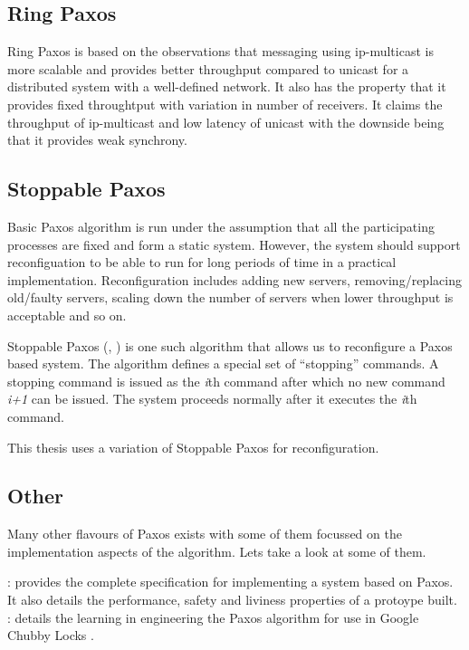 \subsection{Ring Paxos}

Ring Paxos \citep{MarandiPSP10} is based on the observations that messaging
using ip-multicast is more scalable and provides better throughput compared
to unicast for a distributed system with a well-defined network. It also
has the property that it provides fixed throughtput with variation in number
of receivers. It claims the throughput of ip-multicast and low latency of
unicast with the downside being that it provides weak synchrony.

\subsection{Stoppable Paxos}

Basic Paxos algorithm is run under the assumption that all the participating
processes are fixed and form a static system. However, the system should
support reconfiguation to be able to run for long periods of time in a
practical implementation. Reconfiguration includes adding new servers, 
removing/replacing old/faulty servers, scaling down the number of servers
when lower throughput is acceptable and so on.

Stoppable Paxos (\citet{LamportSP08}, \citet{LamportMZ10}) is one such algorithm
that allows us to reconfigure a Paxos based system. The algorithm defines a
special set of ``stopping'' commands. A stopping command is issued as the
\emph{i}th command after which no new command \emph{i+1} can be issued. The 
system proceeds normally after it executes the \emph{i}th command.

This thesis uses a variation of Stoppable Paxos for reconfiguration.

\subsection{Other}

Many other flavours of Paxos exists with some of them focussed on the 
implementation aspects of the algorithm. Lets take a look at some of them.

\begin{itemize}
    : \citet{Kirsch08paxosfor} provides the
    complete specification for implementing a system based on Paxos. It also
    details the performance, safety and liviness properties of a protoype built.
    : \cite{ChandraGR07}
    details the learning in engineering the Paxos algorithm for use in
    Google Chubby Locks \citep{Burrows06}.
\end{itemize}

